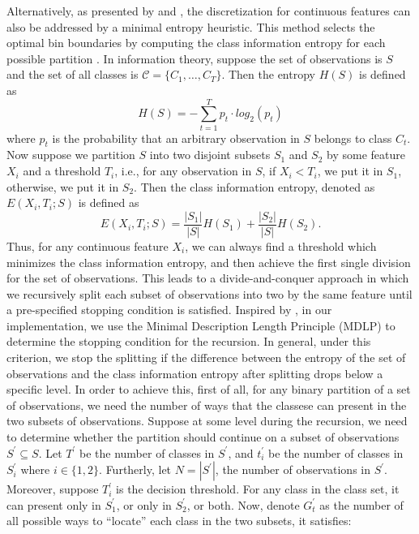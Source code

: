 \documentclass[twoside,11pt]{article}
\begin{document}
Alternatively, as presented by \citet{catlett1991changing} and \citet{fayyad1993multi}, the discretization for continuous features can also be addressed by a minimal entropy heuristic. This method selects the optimal bin boundaries by computing the class information entropy for each possible partition \citep{dougherty1995supervised}. In information theory, suppose the set of observations is $S$ and the set of all classes is $\mathcal{C}=\{C_1,\dots,C_T\}$. Then the entropy $H(S)$ is defined as 
\begin{equation*}
    H(S)=-\sum_{t=1}^T p_t\cdot log_2(p_t)
\end{equation*}
where $p_t$ is the probability that an arbitrary observation in $S$ belongs to class $C_t$. Now suppose we partition $S$ into two disjoint subsets $S_1$ and $S_2$ by some feature $X_i$ and a threshold $T_i$, i.e., for any observation in $S$, if $X_i<T_i$, we put it in $S_1$, otherwise, we put it in $S_2$. Then the class information entropy, denoted as $E(X_i,T_i;S)$ is defined as
\begin{equation*}
    E(X_i,T_i;S)=\frac{|S_1|}{|S|}H(S_1)+\frac{|S_2|}{|S|}H(S_2).
\end{equation*}
Thus, for any continuous feature $X_i$, we can always find a threshold which minimizes the class information entropy, and then achieve the first single division for the set of observations. This leads to a divide-and-conquer approach in which we recursively split each subset of observations into two by the same feature until a pre-specified stopping condition is satisfied. Inspired by \citet{fayyad1993multi}, in our implementation, we use the Minimal Description Length Principle (MDLP) to determine the stopping condition for the recursion. In general, under this criterion, we stop the splitting if the difference between the entropy of the set of observations and the class information entropy after splitting drops below a specific level. In order to achieve this, first of all, for any binary partition of a set of observations, we need the number of ways that the classese can present in the two subsets of observations. Suppose at some level during the recursion, we need to determine whether the partition should continue on a subset of observations $S^\prime\subseteq S$. Let $T^\prime$ be the number of classes in $S^\prime$, and $t_i^\prime$ be the number of classes in $S_i^\prime$ where $i\in\{1,2\}$. Furtherly, let $N=|S^\prime|$, the number of observations in $S^\prime$. Moreover, suppose $T_i^\prime$ is the decision threshold. For any class in the class set, it can present only in $S_1^\prime$, or only in $S_2^\prime$, or both. Now, denote $G_t^\prime$ as the number of all possible ways to ``locate'' each class in the two subsets, it satisfies:
\end{document}
